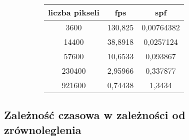\begin{figure}[!ht]
\advance\leftskip-2cm
\begin{subfigure}{.5\textwidth}
\end{subfigure}
\hspace{2cm}
\begin{subfigure}{.5\textwidth}
		\begin{longtable}{|c|c|c|} \hline
	    liczba pikseli & fps & spf \\ \hline
	    3600 & 130,825 & 0,00764382 \\ 
	    14400 &	38,8918 & 0,0257124 \\
		57600 & 10,6533 & 0,093867 \\
		230400 & 2,95966 & 0,337877 \\
		921600 & 0,74438 & 1,3434 \\
		\hline
		\end{longtable}
\end{subfigure}
\end{figure}


\subsection{Zależność czasowa w zależności od zrównoleglenia}

